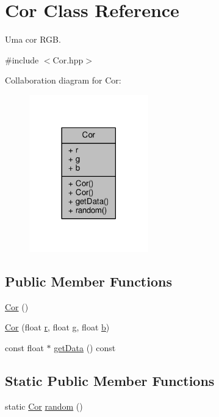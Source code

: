 \hypertarget{classCor}{\section{Cor Class Reference}
\label{classCor}
}


Uma cor R\+G\+B.  




{\ttfamily \#include $<$Cor.\+hpp$>$}



Collaboration diagram for Cor\+:
\nopagebreak
\begin{figure}[H]
\begin{center}
\leavevmode
\includegraphics[width=146pt]{classCor__coll__graph}
\end{center}
\end{figure}
\subsection*{Public Member Functions}
\begin{DoxyCompactItemize}
\item 
\hyperlink{classCor_a864fd08c946de50a77cc8b6fd4e7480b}{Cor} ()
\item 
\hyperlink{classCor_ab6e8df5590c8ff0499ce288660a8d3f8}{Cor} (float \hyperlink{classCor_ab7667e786c55c67493b7adfdaae5b44f}{r}, float \hyperlink{classCor_ac6f619ac3749ad997a1c039257ee344e}{g}, float \hyperlink{classCor_a66f9d828b3579b52c88183db73f41f28}{b})
\item 
const float $\ast$ \hyperlink{classCor_aab820fa51901e8088ed072a68ae60ec9}{get\+Data} () const 
\end{DoxyCompactItemize}
\subsection*{Static Public Member Functions}
\begin{DoxyCompactItemize}
\item 
static \hyperlink{classCor}{Cor} \hyperlink{classCor_aec6564749cadce061c6b3e02c066e2ef}{random} ()
\end{DoxyCompactItemize}
